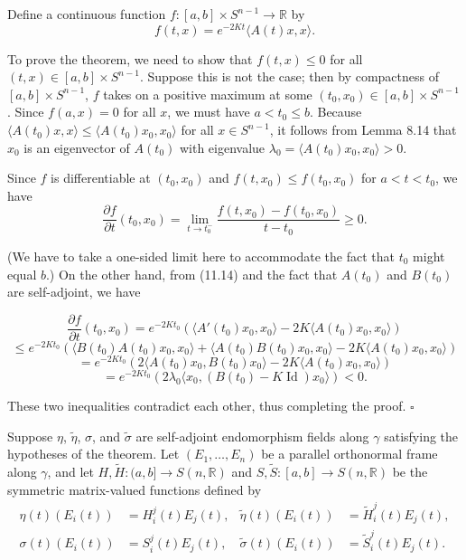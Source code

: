 Define a continuous function $f : [a,b] \times S^{n-1} \to \mathbb{R}$ by
\[
f(t,x) = e^{-2Kt} \langle A(t)x, x \rangle.
\]

To prove the theorem, we need to show that $f(t,x) \le 0$ for all $(t,x) \in [a,b] \times S^{n-1}$. Suppose this is not the case; then by compactness of $[a,b] \times S^{n-1}$, $f$ takes on a positive maximum at some $(t_0, x_0) \in [a,b] \times S^{n-1}$. Since $f(a,x) = 0$ for all $x$, we must have $a < t_0 \le b$. Because $\langle A(t_0)x, x \rangle \le \langle A(t_0)x_0, x_0 \rangle$ for all $x \in S^{n-1}$, it follows from Lemma 8.14 that $x_0$ is an eigenvector of $A(t_0)$ with eigenvalue $\lambda_0 = \langle A(t_0)x_0, x_0 \rangle > 0$.

Since $f$ is differentiable at $(t_0, x_0)$ and $f(t, x_0) \le f(t_0, x_0)$ for $a < t < t_0$, we have
\[
\frac{\partial f}{\partial t}(t_0, x_0) = \lim_{t \to t_0^-} \frac{f(t,x_0) - f(t_0, x_0)}{t - t_0} \ge 0.
\]

(We have to take a one-sided limit here to accommodate the fact that $t_0$ might equal $b$.) On the other hand, from (11.14) and the fact that $A(t_0)$ and $B(t_0)$ are self-adjoint, we have

\[
\frac{\partial f}{\partial t}(t_0, x_0) = e^{-2Kt_0}\left(\langle A'(t_0)x_0, x_0 \rangle - 2K \langle A(t_0)x_0, x_0 \rangle\right)
\]
\[
\le e^{-2Kt_0}\left(\langle B(t_0)A(t_0)x_0, x_0 \rangle + \langle A(t_0)B(t_0)x_0, x_0 \rangle - 2K \langle A(t_0)x_0, x_0 \rangle\right)
\]
\[
= e^{-2Kt_0}\left(2\langle A(t_0)x_0, B(t_0)x_0 \rangle - 2K \langle A(t_0)x_0, x_0 \rangle\right)
\]
\[
= e^{-2Kt_0}\left(2\lambda_0 \langle x_0, (B(t_0) - K \mathop{\mathrm{Id}})x_0 \rangle\right) < 0.
\]

These two inequalities contradict each other, thus completing the proof. \hfill $\square$


Suppose $\eta$, $\tilde{\eta}$, $\sigma$, and $\tilde{\sigma}$ are self-adjoint endomorphism fields
along $\gamma$ satisfying the hypotheses of the theorem. Let $(E_1, \ldots, E_n)$ be a parallel
orthonormal frame along $\gamma$, and let $H, \tilde{H}: (a,b] \to S(n,\mathbb{R})$ and $S, \tilde{S}: [a,b] \to
S(n,\mathbb{R})$ be the symmetric matrix-valued functions defined by
\begin{align*}
\eta(t)(E_i(t)) &= H^j_i(t)E_j(t), & \tilde{\eta}(t)(E_i(t)) &= \tilde{H}^j_i(t)E_j(t), \\
\sigma(t)(E_i(t)) &= S^j_i(t)E_j(t), & \tilde{\sigma}(t)(E_i(t)) &= \tilde{S}^j_i(t)E_j(t).
\end{align*}


